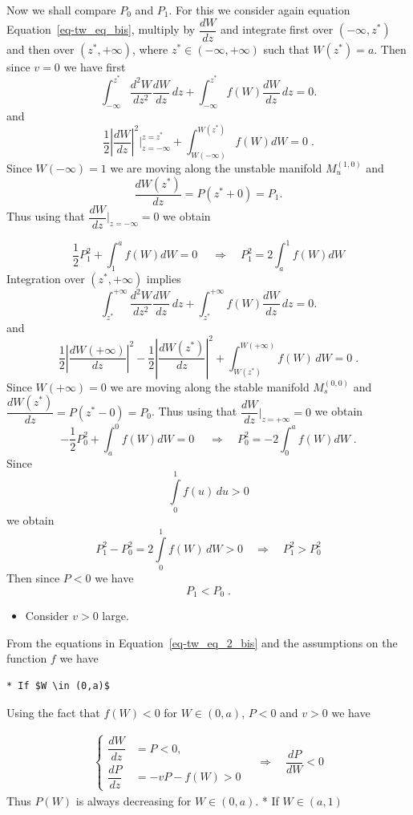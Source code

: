 \documentclass[
  letterpaper,
  DIV=11,
  numbers=noendperiod]{scrreprt}
\providecommand{\tightlist}{%
  \setlength{\itemsep}{0pt}\setlength{\parskip}{0pt}}\usepackage{longtable,booktabs,array}
\theoremstyle{definition}
\theoremstyle{plain}
\theoremstyle{plain}
\theoremstyle{remark}
\begin{document}
Now we shall compare \(P_0\) and \(P_1\). For this we consider again
equation Equation~\ref{eq-tw_eq_bis}, multiply by \(\dfrac{dW}{dz}\) and
integrate first over \((-\infty, z^\ast)\) and then over
\((z^\ast, + \infty)\), where \(z^\ast \in (-\infty, + \infty)\) such
that \(W(z^\ast)=a\). Then since \(v=0\) we have first \[    
    \int_{-\infty}^{z^\ast}  \dfrac{d^2W}{dz^2} \dfrac{dW}{dz} \, dz   + \int_{-\infty}^{z^\ast}f(W)\dfrac{dW}{dz} \, dz =0.
\] and \[
    \frac 12\left|\dfrac{dW}{dz}\right|^2 \Big|_{z=-\infty}^{z=z^\ast}  + \int_{W(-\infty)}^{W(z^\ast)}f(W) dW=0 \; .
\] Since \(W(-\infty) =1\) we are moving along the unstable manifold
\(M_u^{(1,0)}\) and \[
\dfrac{dW(z^\ast)}{dz}=P(z^\ast+ 0) = P_1.
\] Thus using that \(\dfrac{dW}{dz}\Big|_{z= - \infty} =0\) we obtain

\[
    \frac 12 P^2_1  + \int_{1}^{a}f(W) dW=0 \; \quad  \Longrightarrow \quad  P_1^2 = 2 \int_{a}^{1}f(W) dW
\] Integration over \((z^\ast, + \infty)\) implies \[
\int_{z^\ast}^{+ \infty}  \dfrac{d^2W}{dz^2} \dfrac{dW}{dz} \, dz   + \int_{z^\ast}^{+ \infty} f(W)\dfrac{dW}{dz} \, dz =0.
\] and \[
    \frac 12 \left|\dfrac{dW(+ \infty)}{dz}\right|^2 -  \frac 12 \left|\dfrac{dW(z^\ast)}{dz}\right|^2  + \int_{W(z^\ast)}^{W(+ \infty)} f(W) \, dW =0 \; .
\] Since \(W(+\infty) =0\) we are moving along the stable manifold
\(M_s^{(0,0)}\) and \(\dfrac{dW(z^\ast)}{dz}=P(z^\ast- 0) = P_0\). Thus
using that \(\dfrac{dW}{dz}\Big|_{z= + \infty} =0\) we obtain \[
    -\frac 12 P^2_0  + \int_{a}^{0}f(W) dW=0 \;  \quad  \Longrightarrow \quad  P_0^2 = - 2 \int_{0}^{a}f(W) dW\; .
\] Since \[
\int\limits_{0}^{1}f(u) \, du > 0
\] we obtain \[
P^2_1 - P_0^2=2 \int\limits_{0}^{1}f(W) \, dW > 0   \quad  \Longrightarrow \quad P^2_1 > P_0^2
\] Then since \(P<0\) we have \[
P_1 < P_0 \; .
\]

\begin{itemize}
\tightlist
\item
  Consider \(v>0\) large.
\end{itemize}

From the equations in Equation~\ref{eq-tw_eq_2_bis} and the assumptions
on the function \(f\) we have

\begin{verbatim}
* If $W \in (0,a)$
\end{verbatim}

Using the fact that \(f(W) <0\) for \(W \in (0,a)\), \(P<0\) and \(v>0\)
we have

\[
\begin{aligned}
\begin{cases}
\dfrac{dW}{dz} &= P <0, \\
\dfrac{dP}{dz} &= -vP- f(W) >0
\end{cases}  \quad  \Longrightarrow \quad \dfrac{dP}{dW} <0
\end{aligned}
\] Thus \(P(W)\) is always decreasing for \(W \in (0,a)\). * If
\(W \in (a,1)\)
\end{document}
